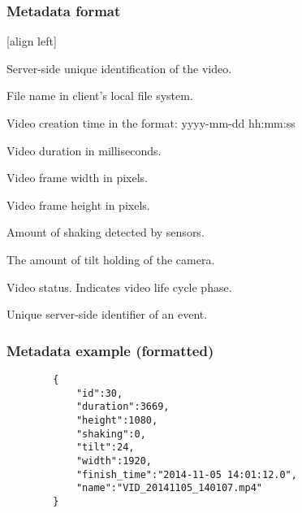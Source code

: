 \begin{frame}
	\frametitle{Metadata format}
	[align left]
	\begin{description}
		\item[id] 
			Server-side unique identification of the video.
		\item[name]
			File name in client's local file system.			
		\item[finish\_time]
			Video creation time in the format: yyyy-mm-dd hh:mm:ss
		\item[duration]
			Video duration in milliseconds.	
		\item[width]
			Video frame width in pixels.
		\item[height]
			Video frame height in pixels.		
		\item[shaking]
			Amount of shaking detected by sensors.
		\item[tilt]
			The amount of tilt holding of the camera.
		\item[status]
			Video status. Indicates video life cycle phase.
		\item[event\_id]
			Unique server-side identifier of an event.		
	\end{description}
\end{frame}

\begin{frame}[fragile]
	\frametitle{Metadata example (formatted)}
		\begin{verbatim}
		{
		    "id":30,
		    "duration":3669,
		    "height":1080,
		    "shaking":0,
		    "tilt":24,
		    "width":1920,
		    "finish_time":"2014-11-05 14:01:12.0",
		    "name":"VID_20141105_140107.mp4"
		}
		\end{verbatim}
\end{frame}

